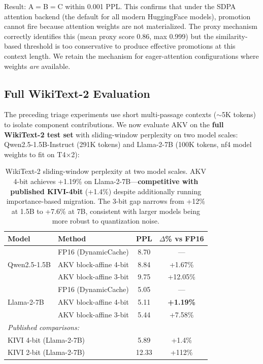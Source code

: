 \documentclass[11pt,a4paper]{article}
\begin{document}
Result: A$=$B$=$C within 0.001 PPL. This confirms that under the SDPA attention backend (the default for all modern HuggingFace models), promotion cannot fire because attention weights are not materialized. The proxy mechanism correctly identifies this (mean proxy score 0.86, max 0.999) but the similarity-based threshold is too conservative to produce effective promotions at this context length. We retain the mechanism for eager-attention configurations where weights \textit{are} available.

\subsection{Full WikiText-2 Evaluation}
\label{sec:full_wikitext}

The preceding triage experiments use short multi-passage contexts ($\sim$5K tokens) to isolate component contributions. We now evaluate AKV on the \textbf{full WikiText-2 test set} with sliding-window perplexity on two model scales: Qwen2.5-1.5B-Instruct (291K tokens) and Llama-2-7B (100K tokens, nf4 model weights to fit on T4$\times$2):

\begin{table}[h]
\centering
\begin{tabular}{llcc}
\toprule
\textbf{Model} & \textbf{Method} & \textbf{PPL} & \textbf{$\Delta$\% vs FP16} \\
\midrule
\multirow{3}{*}{Qwen2.5-1.5B} & FP16 (DynamicCache) & 8.70 & --- \\
& AKV block-affine 4-bit & 8.84 & +1.67\% \\
& AKV block-affine 3-bit & 9.75 & +12.05\% \\
\midrule
\multirow{3}{*}{Llama-2-7B} & FP16 (DynamicCache) & 5.05 & --- \\
& AKV block-affine 4-bit & 5.11 & \textbf{+1.19\%} \\
& AKV block-affine 3-bit & 5.44 & +7.58\% \\
\midrule
\multicolumn{4}{l}{\textit{Published comparisons:}} \\
\multicolumn{2}{l}{KIVI 4-bit (Llama-2-7B)} & 5.89 & +1.4\% \\
\multicolumn{2}{l}{KIVI 2-bit (Llama-2-7B)} & 12.33 & +112\% \\
\bottomrule
\end{tabular}
\caption{WikiText-2 sliding-window perplexity at two model scales. AKV 4-bit achieves +1.19\% on Llama-2-7B---\textbf{competitive with published KIVI-4bit} (+1.4\%) despite additionally running importance-based migration. The 3-bit gap narrows from +12\% at 1.5B to +7.6\% at 7B, consistent with larger models being more robust to quantization noise.}
\label{tab:full_wikitext}
\end{table}
\end{document}
